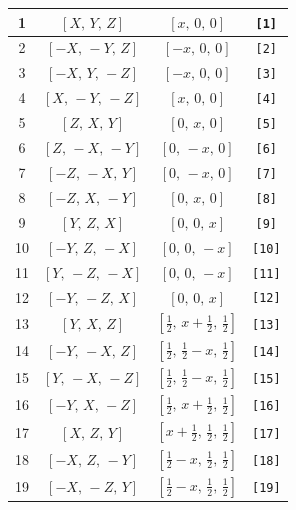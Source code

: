 \documentclass[fleqn,8pt]{jsarticle}
\begin{document}
\begin{longtable}{cccc}
1 & $\left[ X,\, Y,\, Z \right]$ & $\left[ x,\, 0,\, 0 \right]$ & {\tt [1]} \\ \hline
2 & $\left[ - X,\, - Y,\, Z \right]$ & $\left[ - x,\, 0,\, 0 \right]$ & {\tt [2]} \\ \hline
3 & $\left[ - X,\, Y,\, - Z \right]$ & $\left[ - x,\, 0,\, 0 \right]$ & {\tt [3]} \\ \hline
4 & $\left[ X,\, - Y,\, - Z \right]$ & $\left[ x,\, 0,\, 0 \right]$ & {\tt [4]} \\ \hline
5 & $\left[ Z,\, X,\, Y \right]$ & $\left[ 0,\, x,\, 0 \right]$ & {\tt [5]} \\ \hline
6 & $\left[ Z,\, - X,\, - Y \right]$ & $\left[ 0,\, - x,\, 0 \right]$ & {\tt [6]} \\ \hline
7 & $\left[ - Z,\, - X,\, Y \right]$ & $\left[ 0,\, - x,\, 0 \right]$ & {\tt [7]} \\ \hline
8 & $\left[ - Z,\, X,\, - Y \right]$ & $\left[ 0,\, x,\, 0 \right]$ & {\tt [8]} \\ \hline
9 & $\left[ Y,\, Z,\, X \right]$ & $\left[ 0,\, 0,\, x \right]$ & {\tt [9]} \\ \hline
10 & $\left[ - Y,\, Z,\, - X \right]$ & $\left[ 0,\, 0,\, - x \right]$ & {\tt [10]} \\ \hline
11 & $\left[ Y,\, - Z,\, - X \right]$ & $\left[ 0,\, 0,\, - x \right]$ & {\tt [11]} \\ \hline
12 & $\left[ - Y,\, - Z,\, X \right]$ & $\left[ 0,\, 0,\, x \right]$ & {\tt [12]} \\ \hline
13 & $\left[ Y,\, X,\, Z \right]$ & $\left[ \frac{1}{2},\, x + \frac{1}{2},\, \frac{1}{2} \right]$ & {\tt [13]} \\ \hline
14 & $\left[ - Y,\, - X,\, Z \right]$ & $\left[ \frac{1}{2},\, \frac{1}{2} - x,\, \frac{1}{2} \right]$ & {\tt [14]} \\ \hline
15 & $\left[ Y,\, - X,\, - Z \right]$ & $\left[ \frac{1}{2},\, \frac{1}{2} - x,\, \frac{1}{2} \right]$ & {\tt [15]} \\ \hline
16 & $\left[ - Y,\, X,\, - Z \right]$ & $\left[ \frac{1}{2},\, x + \frac{1}{2},\, \frac{1}{2} \right]$ & {\tt [16]} \\ \hline
17 & $\left[ X,\, Z,\, Y \right]$ & $\left[ x + \frac{1}{2},\, \frac{1}{2},\, \frac{1}{2} \right]$ & {\tt [17]} \\ \hline
18 & $\left[ - X,\, Z,\, - Y \right]$ & $\left[ \frac{1}{2} - x,\, \frac{1}{2},\, \frac{1}{2} \right]$ & {\tt [18]} \\ \hline
19 & $\left[ - X,\, - Z,\, Y \right]$ & $\left[ \frac{1}{2} - x,\, \frac{1}{2},\, \frac{1}{2} \right]$ & {\tt [19]} \\ \hline

\end{longtable}
\end{document}
